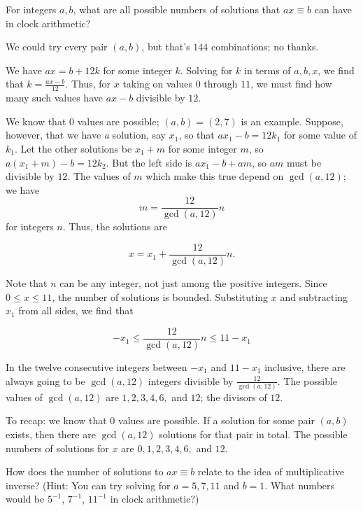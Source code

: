 \documentclass[../key.tex]{subfiles}
\begin{document}
\begin{inner_problem}
\item For integers $a,b$, what are all possible numbers of solutions that $ax\equiv b$ can have in clock arithmetic?
\end{inner_problem}

We could try every pair $(a,b)$, but that's $144$ combinations; no thanks.

We have $ax=b+12k$ for some integer $k$. Solving for $k$ in terms of $a,b,x$, we find that $k=\frac{ax-b}{12}$. Thus, for $x$ taking on values $0$ through $11$, we must find how many such values have $ax-b$ divisible by $12$.

We know that $0$ values are possible; $(a,b)=(2,7)$ is an example. Suppose, however, that we have \textit{a} solution, say $x_1$, so that $ax_1-b=12k_1$ for some value of $k_1$. Let the other solutions be $x_1+m$ for some integer $m$, so $a(x_1+m)-b=12k_2$. But the left side is $ax_1-b+am$, so $am$ must be divisible by $12$. The values of $m$ which make this true depend on $\gcd (a,12)$; we have $$m=\frac{12}{\gcd(a,12)}n$$ for integers $n$. Thus, the solutions are

$$x=x_1+\frac{12}{\gcd(a,12)}n.$$

Note that $n$ can be any integer, not just among the positive integers. Since $0\leq x \leq 11$, the number of solutions is bounded. Substituting $x$ and subtracting $x_1$ from all sides, we find that

$$-x_1\leq \frac{12}{\gcd(a,12)}n\leq 11-x_1$$

In the twelve consecutive integers between $-x_1$ and $11-x_1$ inclusive, there are always going to be $\gcd (a,12)$ integers divisible by $\frac{12}{\gcd(a,12)}$. The possible values of $\gcd (a,12)$ are $1,2,3,4,6,$ and $12$; the divisors of $12$.

To recap: we know that $0$ values are possible. If a solution for some pair $(a,b)$ exists, then there are $\gcd(a,12)$ solutions for that pair in total. The possible numbers of solutions for $x$ are $0,1,2,3,4,6,$ and $12$.

\begin{outer_problem}
\item How does the number of solutions to $ax\equiv b$ relate to the idea of multiplicative inverse? (Hint: You can try solving for $a=5,7,11$ and $b=1$. What numbers would be $5^{-1}$, $7^{-1}$, $11^{-1}$ in clock arithmetic?)
\end{outer_problem}
\end{document}
